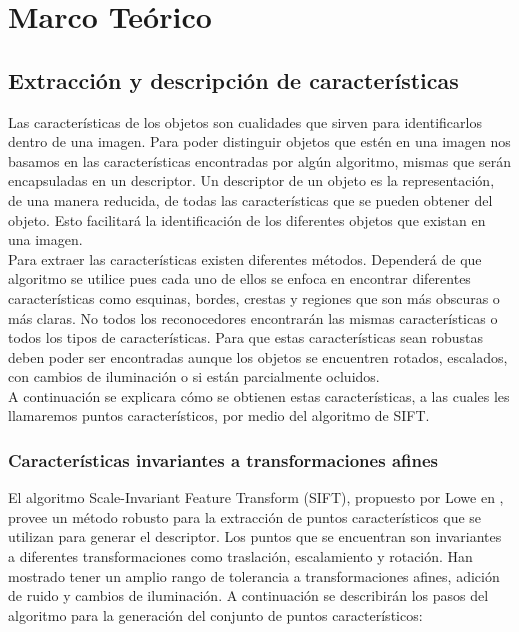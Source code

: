 \chapter {Marco Teórico}
\section {Extracción y descripción de características}
Las características de los objetos son cualidades que sirven para identificarlos  dentro de una imagen. Para poder distinguir objetos que estén en una imagen nos basamos en las características encontradas por algún algoritmo, mismas que serán encapsuladas en un descriptor. Un descriptor de un objeto es la representación, de una manera reducida, de todas las características que se pueden obtener del objeto. Esto facilitará la identificación de los diferentes objetos que existan en una imagen.\\
Para extraer las características existen diferentes métodos. Dependerá de que algoritmo se utilice pues cada uno de ellos se enfoca en encontrar diferentes características como esquinas, bordes, crestas y regiones que son más obscuras o más claras. No todos los reconocedores encontrarán las mismas características o todos los tipos de características. Para que estas características sean robustas deben poder ser encontradas aunque los objetos se encuentren rotados, escalados, con cambios de iluminación o si están parcialmente ocluidos.\\
A continuación se explicara cómo se obtienen estas características, a las cuales les llamaremos puntos característicos, por medio del algoritmo de SIFT.
\subsection{Características invariantes a transformaciones afines}
El algoritmo Scale-Invariant Feature Transform (SIFT), propuesto por Lowe en \cite{Lowe2004},  provee un método robusto para la extracción de puntos característicos que se utilizan para generar el descriptor. Los puntos que se encuentran son invariantes a diferentes transformaciones como traslación, escalamiento y rotación. Han mostrado tener un amplio rango de tolerancia a transformaciones afines, adición de ruido y cambios de iluminación. A continuación se describirán los pasos del algoritmo para la generación del conjunto de puntos característicos:
